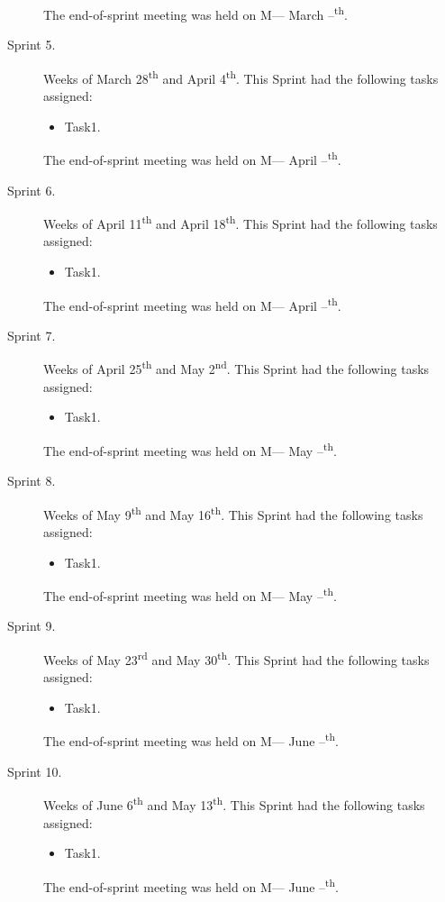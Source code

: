 \begin{description}
	The end-of-sprint meeting was held on M--- March --\textsuperscript{th}.
	\item[Sprint 5.] Weeks of March 28\textsuperscript{th} and April 4\textsuperscript{th}. This Sprint had the following tasks assigned:
	\begin{itemize}
		\item Task1.
	\end{itemize}
	The end-of-sprint meeting was held on M--- April --\textsuperscript{th}.
	\item[Sprint 6.] Weeks of April 11\textsuperscript{th} and April 18\textsuperscript{th}. This Sprint had the following tasks assigned:
	\begin{itemize}
		\item Task1.
	\end{itemize}
	The end-of-sprint meeting was held on M--- April --\textsuperscript{th}.
	\item[Sprint 7.] Weeks of April 25\textsuperscript{th} and May 2\textsuperscript{nd}. This Sprint had the following tasks assigned:
	\begin{itemize}
		\item Task1.
	\end{itemize}
	The end-of-sprint meeting was held on M--- May --\textsuperscript{th}.
	\item[Sprint 8.] Weeks of May 9\textsuperscript{th} and May 16\textsuperscript{th}. This Sprint had the following tasks assigned:
	\begin{itemize}
		\item Task1.
	\end{itemize}
	The end-of-sprint meeting was held on M--- May --\textsuperscript{th}.
	\item[Sprint 9.] Weeks of May 23\textsuperscript{rd} and May 30\textsuperscript{th}. This Sprint had the following tasks assigned:
	\begin{itemize}
		\item Task1.
	\end{itemize}
	The end-of-sprint meeting was held on M--- June --\textsuperscript{th}.
	\item[Sprint 10.] Weeks of June 6\textsuperscript{th} and May 13\textsuperscript{th}. This Sprint had the following tasks assigned:
	\begin{itemize}
		\item Task1.
	\end{itemize}
	The end-of-sprint meeting was held on M--- June --\textsuperscript{th}.
\end{description}

